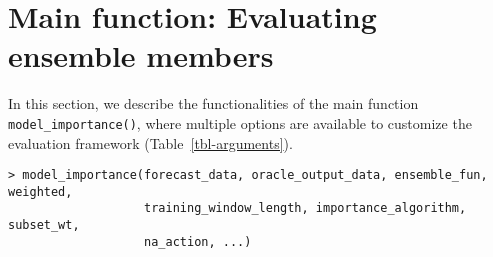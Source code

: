 \documentclass[
  article,
  shortnames,
  notitle]{jss}
\begin{document}
\section{Main function: Evaluating ensemble
members}\label{sec:main-function}

In this section, we describe the functionalities of the main function
\texttt{model\_importance()}, where multiple options are available to
customize the evaluation framework (Table~\ref{tbl-arguments}).

\begin{verbatim}
> model_importance(forecast_data, oracle_output_data, ensemble_fun, weighted,
                   training_window_length, importance_algorithm, subset_wt, 
                   na_action, ...)
\end{verbatim}
\end{document}
